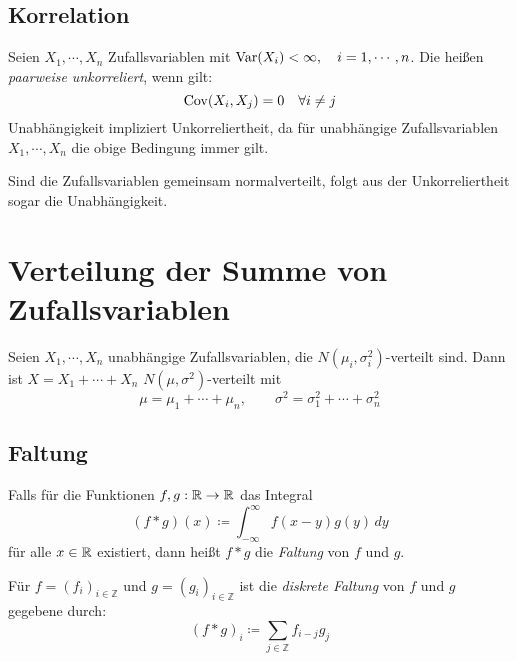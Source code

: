         \subsection{Korrelation} %
            Seien \( X_1, \cdots, X_n \) Zufallsvariablen mit \( \operatorname{Var}(X_i) < \infty, \quad i = 1, \cdots, n \). Die heißen \textit{paarweise unkorreliert}, wenn gilt:
            \begin{equation*}
                \operatorname{Cov}(X_i, X_j) = 0 \quad \forall i \neq j
            \end{equation*}
            Unabhängigkeit impliziert Unkorreliertheit, da für unabhängige Zufallsvariablen \( X_1, \cdots, X_n \) die obige Bedingung immer gilt.
            
            Sind die Zufallsvariablen gemeinsam normalverteilt, folgt aus der Unkorreliertheit sogar die Unabhängigkeit.

    \section{Verteilung der Summe von Zufallsvariablen}
        Seien \( X_1, \cdots, X_n \) unabhängige Zufallsvariablen, die \( N(\mu_i, \sigma_i^2) \)-verteilt sind. Dann ist \( X = X_1 + \cdots + X_n \) \( N(\mu, \sigma^2) \)-verteilt mit
        \begin{equation*}
            \mu = \mu_1 + \cdots + \mu_n, \qquad \sigma^2 = \sigma_1^2 + \cdots + \sigma_n^2
        \end{equation*}

        \subsection{Faltung}
            Falls für die Funktionen \( f, g : \mathbb{R} \rightarrow \mathbb{R} \) das Integral
            \begin{equation*}
                (f \ast g)(x) \coloneqq \int_{-\infty}^{\infty} \! f(x - y) g(y) \, dy
            \end{equation*}
            für alle \(x \in \mathbb{R}\) existiert, dann heißt \( f \ast g \) die \textit{Faltung} von \(f\) und \(g\).
            
            Für \( f = (f_i) _ { i \in \mathbb{Z} } \) und \( g = (g_i)_{i \in \mathbb{Z}} \) ist die \textit{diskrete Faltung} von \(f\) und \(g\) gegebene durch:
            \begin{equation*}
                (f \ast g)_i \coloneqq \sum_{j \in \mathbb{Z}} f_{i - j} g_j
            \end{equation*}
            
